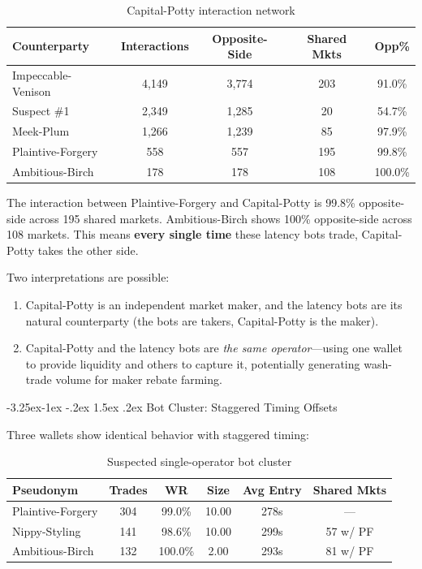 \documentclass[11pt,a4paper]{article}
\makeatletter
\renewcommand\subsection{\@startsection{subsection}{2}{\z@}%
  {-3.25ex\@plus -1ex \@minus -.2ex}%
  {1.5ex \@plus .2ex}%
  {\normalfont\large\bfseries}}
\makeatother
\begin{document}
\begin{table}[H]
\centering
\caption{Capital-Potty interaction network}
\label{tab:network}
\small
\begin{tabular}{@{}lcccc@{}}
\toprule
\textbf{Counterparty} & \textbf{Interactions} & \textbf{Opposite-Side} & \textbf{Shared Mkts} & \textbf{Opp\%} \\
\midrule
Impeccable-Venison & 4,149 & 3,774 & 203 & 91.0\% \\
Suspect \#1 & 2,349 & 1,285 & 20 & 54.7\% \\
Meek-Plum & 1,266 & 1,239 & 85 & 97.9\% \\
Plaintive-Forgery & 558 & 557 & 195 & 99.8\% \\
Ambitious-Birch & 178 & 178 & 108 & 100.0\% \\
\bottomrule
\end{tabular}
\end{table}

The interaction between Plaintive-Forgery and Capital-Potty is 99.8\% opposite-side across 195 shared markets. Ambitious-Birch shows 100\% opposite-side across 108 markets. This means \textbf{every single time} these latency bots trade, Capital-Potty takes the other side.

Two interpretations are possible:
\begin{enumerate}[nosep]
    \item Capital-Potty is an independent market maker, and the latency bots are its natural counterparty (the bots are takers, Capital-Potty is the maker).
    \item Capital-Potty and the latency bots are \emph{the same operator}---using one wallet to provide liquidity and others to capture it, potentially generating wash-trade volume for maker rebate farming.
\end{enumerate}

\subsection{Bot Cluster: Staggered Timing Offsets}

Three wallets show identical behavior with staggered timing:

\begin{table}[H]
\centering
\caption{Suspected single-operator bot cluster}
\label{tab:cluster}
\small
\begin{tabular}{@{}lccccc@{}}
\toprule
\textbf{Pseudonym} & \textbf{Trades} & \textbf{WR} & \textbf{Size} & \textbf{Avg Entry} & \textbf{Shared Mkts} \\
\midrule
Plaintive-Forgery & 304 & 99.0\% & 10.00 & 278s & --- \\
Nippy-Styling & 141 & 98.6\% & 10.00 & 299s & 57 w/ PF \\
Ambitious-Birch & 132 & 100.0\% & 2.00 & 293s & 81 w/ PF \\
\bottomrule
\end{tabular}
\end{table}
\end{document}
